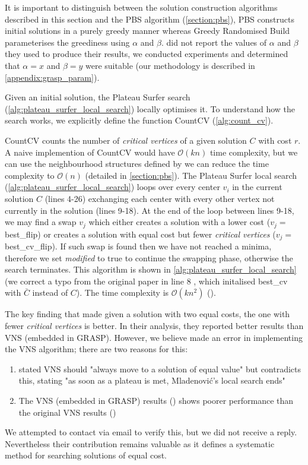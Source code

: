 It is important to distinguish between the solution construction algorithms described in this section and the PBS algorithm (\cref{section:pbs}), PBS constructs initial solutions in a purely greedy manner whereas Greedy Randomised Build parameterises the greediness using $\alpha$ and $\beta$. \textcite{battiti_new_2017} did not report the values of $\alpha$ and $\beta$ they used to produce their results, we conducted experiments and determined that $\alpha =x$ and $\beta =y$ were suitable (our methodology is described in \cref{appendix:grasp_param}).



Given an initial solution, the Plateau Surfer search (\cref{alg:plateau_surfer_local_search}) locally optimises it. To understand how the search works, we explicitly define the function CountCV (\cref{alg:count_cv}).



CountCV counts the number of \emph{critical vertices} of a given solution $C$ with cost $r$. A naive implemention of CountCV would have $\mathcal{O}(kn)$ time complexity, but we can use the neighbourhood structures defined by \textcite{mladenovic_solving_2003} we can reduce the time complexity to $\mathcal{O}(n)$ (detailed in \cref{section:pbs}). The Plateau Surfer local search (\cref{alg:plateau_surfer_local_search}) loops over every center $v_i$ in the current solution $C$ (lines 4-26) exchanging each center with every other vertex not currently in the solution (lines 9-18). At the end of the loop between lines 9-18, we may find a swap $v_j$ which either creates a solution with a lower cost ($v_j=$best\_flip) or creates a solution with equal cost but fewer \emph{critical vertices} ($v_j=$best\_cv\_flip). If such swap is found then we have not reached a minima, therefore we set \emph{modified} to true to continue the swapping phase, otherwise the search terminates. This algorithm is shown in \cref{alg:plateau_surfer_local_search} (we correct a typo from the original paper in line 8 , which initalised best\_cv with $\bar{C}$ instead of $C$). The time complexity is $\mathcal{O}(kn^2)$ (\cite{battiti_new_2017}).



The key finding that \textcite{battiti_new_2017} made given a solution with two equal costs, the one with fewer \emph{critical vertices} is better. In their analysis, they reported better results than VNS (embedded in GRASP). However, we believe \textcite{battiti_new_2017} made an error in implementing the VNS algorithm; there are two reasons for this:
\begin{enumerate}
    \item \textcite{mladenovic_solving_2003} stated VNS should "always move to a
solution of equal value" but \textcite{battiti_new_2017} contradicts this, stating "as soon as a plateau is met, Mladenovi\'{c}’s local search ends"
    \item The VNS (embedded in GRASP) results (\cite{battiti_new_2017}) shows poorer performance than the original VNS results (\cite{mladenovic_solving_2003})
\end{enumerate}

We attempted to contact \textcite{battiti_new_2017} via email to verify this, but we did not receive a reply. Nevertheless their contribution remains valuable as it defines a systematic method for searching solutions of equal cost.